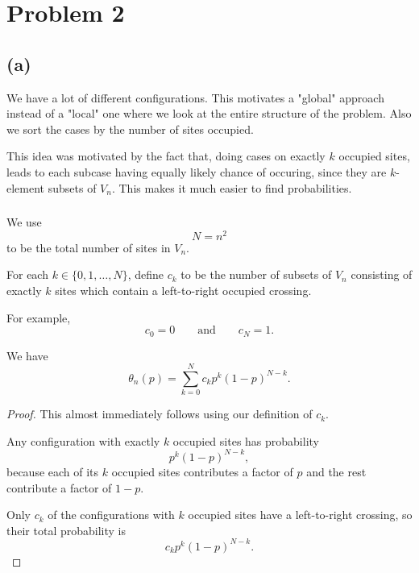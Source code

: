 \documentclass[11pt]{scrartcl}
\begin{document}
	\section{Problem 2}
	
	\subsection{(a)}
	
	\begin{soln}
		We have a lot of different configurations. This motivates a 
        "global" approach instead of a "local" one where we look at the entire 
        structure of the problem. Also we sort the cases by the number of sites 
        occupied. 
		
		This idea was motivated by the fact that, doing cases on exactly $k$
		occupied sites, leads to each subcase having 
        equally likely chance of occuring, 
        since they are $k$-element subsets of $V_n$.
        This makes it much easier to find probabilities. 
		
		\subsubsection*{}
		
		We use
		\[
		N=n^2
		\]
		to be the total number of sites in $V_n$.
		
		For each $k\in\{0,1,\dots,N\}$, define $c_k$ to be the number of
		subsets of $V_n$ consisting of exactly $k$ sites which contain a
		left-to-right occupied crossing.
		
		For example,
		\[
		c_0=0
		\qquad\text{and}\qquad
		c_N=1.
		\]
		
		
		\begin{claim*}
			We have
			\[
			\theta_n(p)
			=
			\sum_{k=0}^{N}
			c_k p^k(1-p)^{N-k}.
			\]
		\end{claim*}
		
		\begin{proof}
			This almost immediately follows using our definition of $c_k$.
			
			Any configuration with exactly $k$ occupied sites has probability
			\[
			p^k(1-p)^{N-k},
			\]
			because each of its $k$ occupied sites contributes a factor of $p$ and
			the rest contribute a factor of $1-p$.
			
			Only $c_k$ of the configurations with $k$ occupied sites have a
			left-to-right crossing, so their total probability is
			\[
			c_kp^k(1-p)^{N-k}.
			\]
			

\end{proof}
\end{soln}
\end{document}
